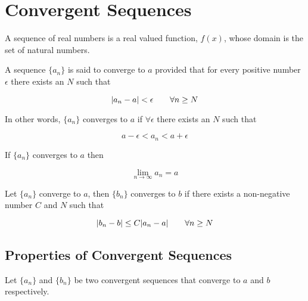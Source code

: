 \newpage
\section{Convergent Sequences}

\begin{definition}[Sequence]
    A sequence of real numbers is a real valued function, $f(x)$, whose domain is the set of natural numbers.
\end{definition}

\begin{definition}[Convergence]
    A sequence $\{a_n\}$ is said to converge to $a$ provided that for every positive number $\epsilon$ there exists an
    $N$ such that

    \[
        {\left\lvert a_n - a \right\rvert} < \epsilon \qquad \forall n \ge N
    \]

    In other words, $\{a_n\}$ converges to $a$ if $\forall \epsilon$ there exists an $N$ such that

    \[
        a - \epsilon < a_n < a + \epsilon
    \]

    If $\{a_n\}$ converges to $a$ then

    \[
        \lim_{n \to \infty} a_n = a
    \]
\end{definition}

\begin{definition}
    Let $\{a_n\}$ converge to $a$, then $\{b_n\}$ converges to $b$ if there exists a non-negative number $C$ and $N$
    such that

    \[
        {\left\lvert b_n - b \right\rvert} \le C{\left\lvert a_n - a \right\rvert} \qquad \forall n \ge N
    \]
\end{definition}

    \subsection{Properties of Convergent Sequences}

    Let $\{a_n\}$ and $\{b_n\}$ be two convergent sequences that converge to $a$ and $b$ respectively.

